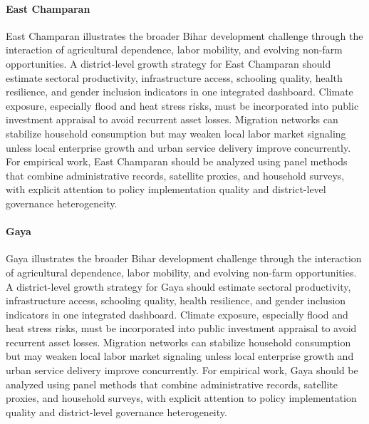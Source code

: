 \documentclass[preprint,12pt]{elsarticle}
\begin{document}
\paragraph{East Champaran} East Champaran illustrates the broader Bihar development challenge through the interaction of agricultural dependence, labor mobility, and evolving non-farm opportunities. A district-level growth strategy for East Champaran should estimate sectoral productivity, infrastructure access, schooling quality, health resilience, and gender inclusion indicators in one integrated dashboard. Climate exposure, especially flood and heat stress risks, must be incorporated into public investment appraisal to avoid recurrent asset losses. Migration networks can stabilize household consumption but may weaken local labor market signaling unless local enterprise growth and urban service delivery improve concurrently. For empirical work, East Champaran should be analyzed using panel methods that combine administrative records, satellite proxies, and household surveys, with explicit attention to policy implementation quality and district-level governance heterogeneity.

\paragraph{Gaya} Gaya illustrates the broader Bihar development challenge through the interaction of agricultural dependence, labor mobility, and evolving non-farm opportunities. A district-level growth strategy for Gaya should estimate sectoral productivity, infrastructure access, schooling quality, health resilience, and gender inclusion indicators in one integrated dashboard. Climate exposure, especially flood and heat stress risks, must be incorporated into public investment appraisal to avoid recurrent asset losses. Migration networks can stabilize household consumption but may weaken local labor market signaling unless local enterprise growth and urban service delivery improve concurrently. For empirical work, Gaya should be analyzed using panel methods that combine administrative records, satellite proxies, and household surveys, with explicit attention to policy implementation quality and district-level governance heterogeneity.
\end{document}
